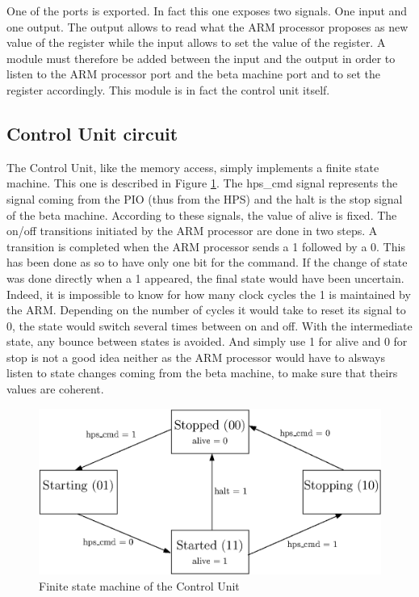 One of the ports is exported. In fact this one exposes two signals. One input and one output. The 
output allows to read what the ARM processor proposes as new value of the register while the input 
allows to set the value of the register. A module must therefore be added between the input and the 
output in order to listen to the ARM processor port and the beta machine port and to set the 
register accordingly. This module is in fact the control unit itself.

\subsection{Control Unit circuit}

The Control Unit, like the memory access, simply implements a finite state machine. This one is 
described in Figure \ref{fig:ctrlu/fsm}. The hps\_cmd signal represents the signal coming from the 
PIO (thus from the HPS) and the halt is the stop signal of the beta machine. According to these 
signals, the value of alive is fixed. The on/off transitions initiated by the ARM processor are 
done in two steps. A transition is completed when the ARM processor sends a 1 followed by a 0. This 
has been done as so to have only one bit for the command. If the change of state was done directly 
when a 1 appeared, the final state would have been uncertain. Indeed, it is impossible to know for 
how many clock cycles the 1 is maintained by the ARM. Depending on the number of cycles it would 
take to reset its signal to 0, the state would switch several times between on and off. With 
the intermediate state, any bounce between states is avoided. And simply use 1 for alive and 0 for
stop is not a good idea neither as the ARM processor would have to alsways listen to state changes
coming from the beta machine, to make sure that theirs values are coherent.

\begin{figure}[ht!]
    \center
    \includegraphics[scale=0.8]{"Chapter5-MAU_CTRLU/res/ctrlu_fsm"}
    \caption{Finite state machine of the Control Unit}
    \label{fig:ctrlu/fsm}
\end{figure}

